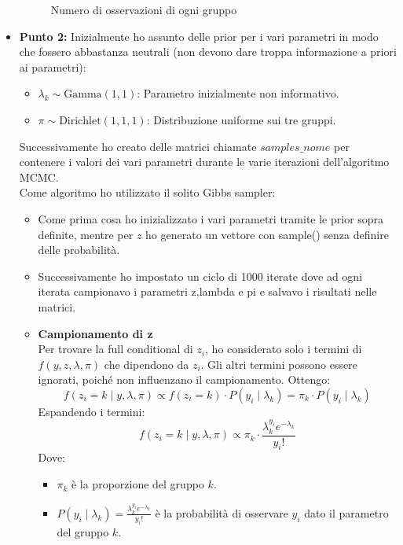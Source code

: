 \documentclass[a4paper,12pt]{article}
\begin{document}
\begin{itemize}
\begin{figure}[h]
			\caption{Numero di osservazioni di ogni gruppo} %
			\label{fig:immagine} %
		\end{figure}
		\newpage
		\item \textbf{Punto 2:}
		Inizialmente ho assunto delle prior per i vari parametri in modo che fossero abbastanza neutrali (non devono dare troppa informazione a priori ai parametri):\\
		\begin{itemize}
			\item $\lambda_k \sim \text{Gamma}(1, 1)$: Parametro inizialmente non informativo.
			\item $\pi \sim \text{Dirichlet}(1, 1, 1)$: Distribuzione uniforme sui tre gruppi.
		\end{itemize}
		Successivamente ho creato delle matrici chiamate $samples \_ nome$ per contenere i valori dei vari parametri durante le varie iterazioni dell'algoritmo MCMC.\\
		Come algoritmo ho utilizzato il solito Gibbs sampler:\\
		\begin{itemize}
			\item Come prima cosa ho inizializzato i vari parametri tramite le prior sopra definite, mentre per $z$ ho generato un vettore con sample() senza definire delle probabilità.
			\item Successivamente ho impostato un ciclo di 1000 iterate dove ad ogni iterata campionavo i parametri z,lambda e pi e salvavo i risultati nelle matrici.
			\item \textbf{Campionamento di z}\\
			Per trovare la full conditional di \( z_i \), ho considerato solo i termini di \( f(y, z, \lambda, \pi) \) che dipendono da \( z_i \). Gli altri termini possono essere ignorati, poiché non influenzano il campionamento. Ottengo:
			\[
			f(z_i = k \mid y, \lambda, \pi) \propto f(z_i = k) \cdot P(y_i \mid \lambda_k)= \pi_k \cdot P(y_i \mid \lambda_k)
			\]
			Espandendo i termini:
			\[
			f(z_i = k \mid y, \lambda, \pi) \propto \pi_k \cdot \frac{\lambda_k^{y_i} e^{-\lambda_k}}{y_i!}
			\]
			Dove:
			\begin{itemize}
				\item \( \pi_k \) è la proporzione del gruppo \( k \).
				\item \( P(y_i \mid \lambda_k) = \frac{\lambda_k^{y_i} e^{-\lambda_k}}{y_i!} \) è la probabilità di osservare \( y_i \) dato il parametro del gruppo \( k \).

\end{itemize}
\end{itemize}
\end{itemize}
\end{document}
